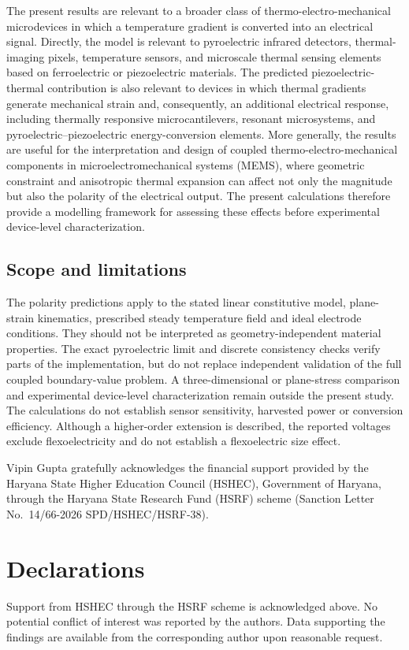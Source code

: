 \documentclass[pdflatex,sn-mathphys-num]{sn-jnl}
\begin{document}
The present results are relevant to a broader class of thermo-electro-mechanical
microdevices in which a temperature gradient is converted into an electrical signal.
Directly, the model is relevant to pyroelectric infrared detectors, thermal-imaging
pixels, temperature sensors, and microscale thermal sensing elements based on
ferroelectric or piezoelectric materials. The predicted piezoelectric-thermal
contribution is also relevant to devices in which thermal gradients generate mechanical
strain and, consequently, an additional electrical response, including thermally
responsive microcantilevers, resonant microsystems, and pyroelectric--piezoelectric
energy-conversion elements. More generally, the results are useful for the
interpretation and design of coupled thermo-electro-mechanical components in
microelectromechanical systems (MEMS), where geometric constraint and anisotropic
thermal expansion can affect not only the magnitude but also the polarity of the
electrical output. The present calculations therefore provide a modelling framework
for assessing these effects before experimental device-level characterization.


\subsection*{Scope and limitations}
The polarity predictions apply to the stated linear constitutive model,
plane-strain kinematics, prescribed steady temperature field and ideal electrode
conditions. They should not be interpreted as geometry-independent material
properties. The exact pyroelectric limit and discrete consistency checks verify
parts of the implementation, but do not replace independent validation of the full
coupled boundary-value problem. A three-dimensional or plane-stress comparison and
experimental device-level characterization remain outside the present study.
The calculations do not establish sensor sensitivity, harvested power or conversion
efficiency. Although a higher-order extension is described, the reported voltages
exclude flexoelectricity and do not establish a flexoelectric size effect.

\backmatter
{}
Vipin Gupta gratefully acknowledges the financial support provided by the Haryana
State Higher Education Council (HSHEC), Government of Haryana, through the Haryana
State Research Fund (HSRF) scheme (Sanction Letter
No.~14/66-2026 SPD/HSHEC/HSRF-38).

\section*{Declarations}
Support from HSHEC through the HSRF scheme is acknowledged above.
No potential conflict of interest was reported by the authors.
Data supporting the findings are available from the corresponding author upon
reasonable request.


\end{document}
